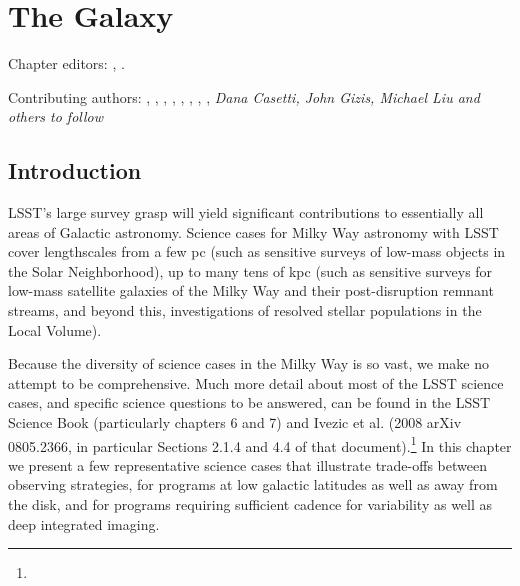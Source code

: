 
\chapter{The Galaxy}
\def\chpname{galaxy}\label{chp:\chpname}

Chapter editors:
,
.

Contributing authors:
,
,
,
,
,
,
,
,
{\it Dana Casetti, John Gizis, Michael Liu and others to follow}



\section{Introduction}
\def\secname{MW_Intro}\label{sec:\secname}

LSST's large survey grasp will yield significant contributions to
essentially all areas of Galactic astronomy. Science cases for Milky
Way astronomy with LSST cover lengthscales from a few pc (such as
sensitive surveys of low-mass objects in the Solar Neighborhood), up
to many tens of kpc (such as sensitive surveys for low-mass satellite
galaxies of the Milky Way and their post-disruption remnant streams,
and beyond this, investigations of resolved stellar populations in the
Local Volume). 

Because the diversity of science cases in the Milky Way is so vast, we
make no attempt to be comprehensive. Much more detail about most of
the LSST science cases, and specific science questions to be answered,
can be found in the LSST Science Book (particularly chapters 6 and 7)
and Ivezic et al. (2008 arXiv 0805.2366, in particular Sections 2.1.4
and 4.4 of that document).\footnote{} In this chapter we present a few
representative science cases that illustrate trade-offs between
observing strategies, for programs at low galactic latitudes as well
as away from the disk, and for programs requiring sufficient cadence
for variability as well as deep integrated imaging. 

